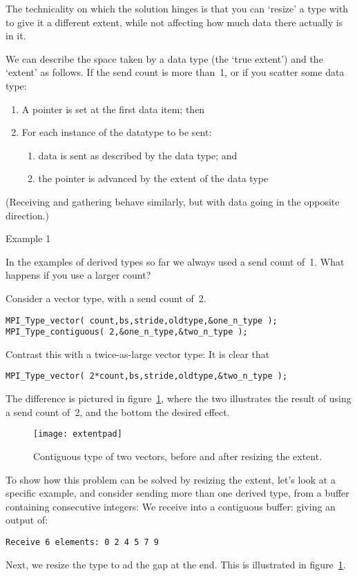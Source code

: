 The technicality on which the solution hinges is that you can `resize' a type
with 
to give it a different extent, while not affecting how much data there
actually is in it.

We can describe the space taken by a data type (the `true extent') and the `extent'
as follows. If the send count is more than~1, or if you scatter some data type:
\begin{enumerate}
\item A pointer is set at the first data item; then
\item For each instance of the datatype to be sent:
  \begin{enumerate}
  \item data is sent as described by the data type; and
  \item the pointer is advanced by the extent of the data type
  \end{enumerate}
\end{enumerate}
(Receiving and gathering behave similarly, but with data going in the opposite direction.)

 {Example 1}
\label{sec:extent-ex1}

In the examples of derived types so far
we always used a send count of~1.
What happens if you use a larger count?

Consider a vector type, with a send count of~2.
\begin{lstlisting}
MPI_Type_vector( count,bs,stride,oldtype,&one_n_type );
MPI_Type_contiguous( 2,&one_n_type,&two_n_type );
\end{lstlisting}
Contrast this with a twice-as-large vector type:
It is clear that
\begin{lstlisting}
MPI_Type_vector( 2*count,bs,stride,oldtype,&two_n_type );
\end{lstlisting}
The difference is pictured in figure~\ref{fig:extentpad},
where the two illustrates the result of using a send count of~2,
and the bottom the desired effect.

\begin{figure}[ht]
  \texttt{[image: extentpad]}
  \caption{Contiguous type of two vectors,
    before and after resizing the extent.}
  \label{fig:extentpad}
\end{figure}

To show how this problem can be solved by resizing the extent,
let's look at a specific example, and
consider sending more than one derived type,
from a buffer containing consecutive integers:
%
%
We receive into a contiguous buffer:
%
%
giving an output of:
\begin{verbatim}
Receive 6 elements: 0 2 4 5 7 9
\end{verbatim}
Next, we resize the type to ad the gap at the end.
This is illustrated in figure~\ref{fig:extentpad}.

